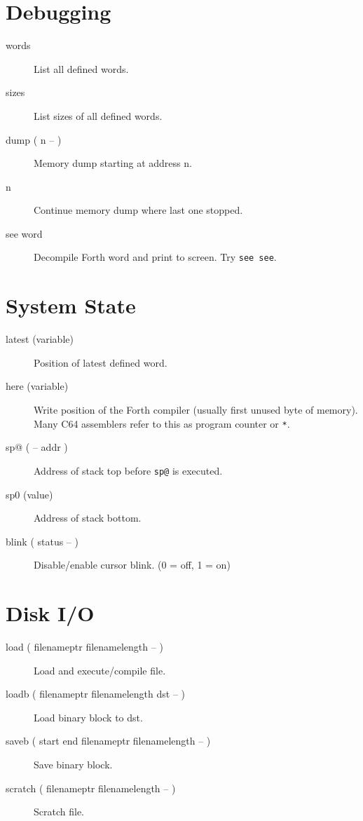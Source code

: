 \section{Debugging}

\begin{description}
\item[words] List all defined words.
\item[sizes] List sizes of all defined words.
\item[dump ( n -- )] Memory dump starting at address n.
\item[n] Continue memory dump where last one stopped.
\item[see word] Decompile Forth word and print to screen. Try \texttt{see see}.
\end{description}


\section{System State}

\begin{description}

\item[latest (variable)] Position of latest defined word.

\item[here (variable)] Write position of the Forth compiler (usually first unused byte of memory). Many C64 assemblers refer to this as program counter or \texttt{*}.

\item[sp@ ( -- addr )] Address of stack top before \texttt{sp@} is executed.
\item[sp0 (value)] Address of stack bottom.
\item[blink ( status -- )] Disable/enable cursor blink. (0 = off, 1 = on)

\end{description}


\section{Disk I/O}

\begin{description}
\item[load ( filenameptr filenamelength -- )] Load and execute/compile file.
\item[loadb ( filenameptr filenamelength dst -- )] Load binary block to dst.
\item[saveb ( start end filenameptr filenamelength -- )] Save binary block.
\item[scratch ( filenameptr filenamelength -- )] Scratch file.
\end{description}


